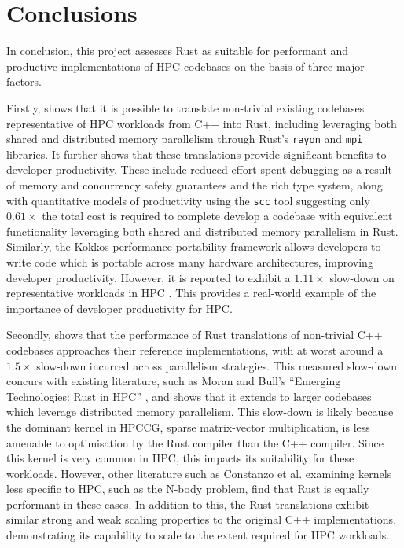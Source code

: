 \chapter{Conclusions}
\label{ch:conclusions}


In conclusion, this project assesses Rust as suitable for performant and productive implementations of \acrshort{HPC} codebases on the basis of three major factors.

Firstly,  shows that it is possible to translate non-trivial existing codebases representative of \acrshort{HPC} workloads from C++ into Rust, including leveraging both shared and distributed memory parallelism through Rust's \texttt{rayon} and \texttt{mpi} libraries. It further shows that these translations provide significant benefits to developer productivity. These include reduced effort spent debugging as a result of memory and concurrency safety guarantees and the rich type system, along with quantitative models of productivity using the \texttt{scc} tool suggesting only $0.61 \times$ the total cost is required to complete develop a codebase with equivalent functionality leveraging both shared and distributed memory parallelism in Rust.
Similarly, the Kokkos performance portability framework allows developers to write code which is portable across many hardware architectures, improving developer productivity. However, it is reported to exhibit a $1.11 \times$ slow-down on representative workloads in \acrshort{HPC} \cite{carteredwardsKokkosEnablingManycore2014}. This provides a real-world example of the importance of developer productivity for \acrshort{HPC}.

Secondly,  shows that the performance of Rust translations of non-trivial C++ codebases approaches their reference implementations, with at worst around a $1.5 \times$ slow-down incurred across parallelism strategies. This measured slow-down concurs with existing literature, such as Moran and Bull's ``Emerging Technologies: Rust in HPC'' \cite{moranEmergingTechnologiesRust2023}, and shows that it extends to larger codebases which leverage distributed memory parallelism. This slow-down is likely because the dominant kernel in HPCCG, sparse matrix-vector multiplication, is less amenable to optimisation by the Rust compiler than the C++ compiler. Since this kernel is very common in \acrshort{HPC}, this impacts its suitability for these workloads. However, other literature such as Constanzo et al. \cite{costanzoPerformanceVsProgramming2021} examining kernels less specific to \acrshort{HPC}, such as the N-body problem, find that Rust is equally performant in these cases. In addition to this, the Rust translations exhibit similar strong and weak scaling properties to the original C++ implementations, demonstrating its capability to scale to the extent required for \acrshort{HPC} workloads.

